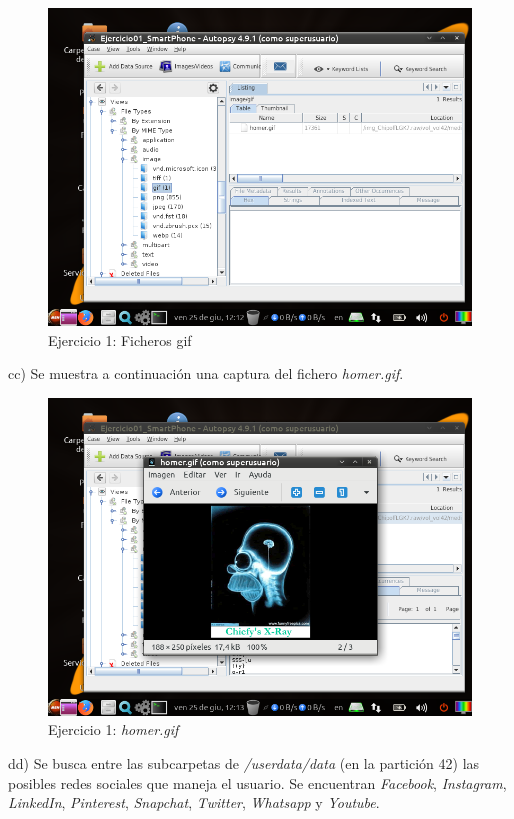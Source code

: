 \documentclass[11pt]{article}
\begin{document}
\begin{figure}[H]
    \caption{Ejercicio 1: Ficheros gif}
    \centering
    \includegraphics[scale=0.7]{e1-27.png}
\end{figure}

cc) Se muestra a continuación una captura del fichero \textit{homer.gif}.

\begin{figure}[H]
    \caption{Ejercicio 1: \textit{homer.gif}}
    \centering
    \includegraphics[scale=0.7]{e1-28.png}
\end{figure}

dd) Se busca entre las subcarpetas de \textit{/userdata/data} (en la partición 42) las posibles redes sociales que maneja el usuario. Se encuentran \textit{Facebook}, \textit{Instagram}, \textit{LinkedIn}, \textit{Pinterest}, \textit{Snapchat}, \textit{Twitter}, \textit{Whatsapp} y \textit{Youtube}.
\end{document}
